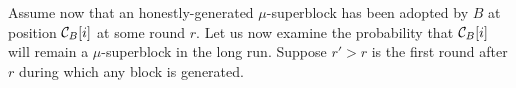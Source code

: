 %
%
Assume now that an honestly-generated $\mu$-superblock has been adopted by $B$
at position $\mathcal{C}_B[i]$ at some round $r$. Let us now examine the probability
that $\mathcal{C}_B[i]$ will remain a $\mu$-superblock in the long run. Suppose $r' >
r$ is the first round after $r$ during which any block is generated.
